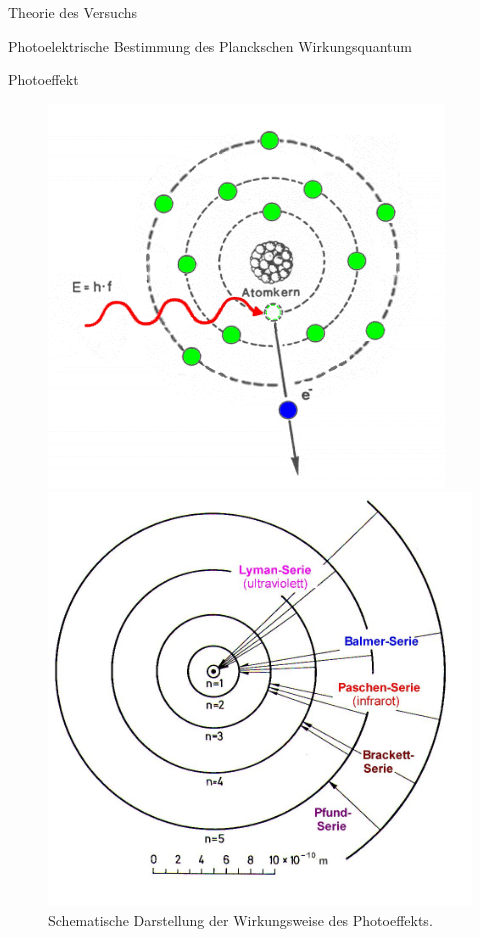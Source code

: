 \documentclass[pdftex, a4paper,11pt, twoside, ngerman]{report}
\begin{document}
\begin{chapter}{Theorie des Versuchs}
\begin{section}{Photoelektrische Bestimmung des Planckschen Wirkungsquantum}
\begin{subsection}{Photoeffekt}
        
        \begin{figure}[htbp]
          \centering
          \begin{minipage}{0.48\textwidth}
            \centering
            \includegraphics[width=.9\textwidth]{Figures/photoeffekt.png}
            \caption{Schematische Darstellung der Wirkungsweise des Photoeffekts.\cite{bib:Photoeffekt}}\label{fig:Photoeffekt}
          \end{minipage}\quad
          \begin{minipage}{0.48\textwidth}
            \centering
            \includegraphics[width=.9\textwidth]{Figures/BohrschesAtommodellSerien.png}

\end{minipage}
\end{figure}
\end{subsection}
\end{section}
\end{chapter}
\end{document}
